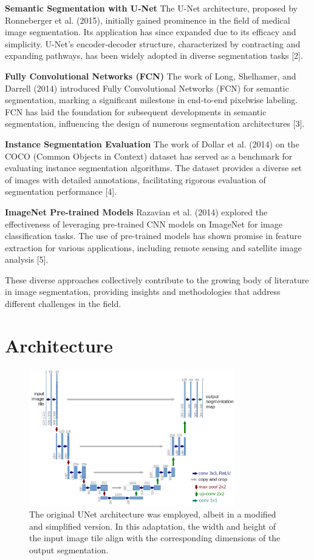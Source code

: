 \documentclass{article}
\begin{document}
\textbf{Semantic Segmentation with U-Net}
The U-Net architecture, proposed by Ronneberger et al. (2015), initially gained prominence
in the field of medical image segmentation. Its application has since expanded due to its
efficacy and simplicity. U-Net's encoder-decoder structure, characterized by contracting
and expanding pathways, has been widely adopted in diverse segmentation tasks [2].

\textbf{Fully Convolutional Networks (FCN)}
The work of Long, Shelhamer, and Darrell (2014) introduced Fully Convolutional Networks (FCN)
for semantic segmentation, marking a significant milestone in end-to-end pixelwise labeling. 
FCN has laid the foundation for subsequent developments in semantic segmentation, influencing
the design of numerous segmentation architectures [3].

\textbf{Instance Segmentation Evaluation}
The work of Dollar et al. (2014) on the COCO (Common Objects in Context) dataset has served as
a benchmark for evaluating instance segmentation algorithms. The dataset provides a diverse
set of images with detailed annotations, facilitating rigorous evaluation of segmentation performance [4].

\textbf{ImageNet Pre-trained Models}
Razavian et al. (2014) explored the effectiveness of leveraging pre-trained CNN models on ImageNet for
image classification tasks. The use of pre-trained models has shown promise in feature extraction for
various applications, including remote sensing and satellite image analysis [5].

These diverse approaches collectively contribute to the growing body of literature in image
segmentation, providing insights and methodologies that address different challenges in the field.


\section{Architecture}


\begin{figure}
  \centering
  \includegraphics[width=0.8\textwidth]{u-net-architecture}
  \caption{
    The original UNet architecture was employed, albeit in a modified and simplified version.
    In this adaptation, the width and height of the input image tile align with the
    corresponding dimensions of the output segmentation.
  }
  \label{fig:unet}
\end{figure}
\end{document}
